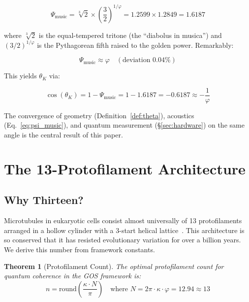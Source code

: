 \documentclass[12pt,a4paper]{article}
\theoremstyle{plain}
\newtheorem{theorem}{Theorem}[section]
\theoremstyle{definition}
\newcommand{\thetaK}{\theta_K}
\newcommand{\golden}{\varphi}
\newcommand{\kap}{\kappa}
\begin{document}
\begin{equation}
\label{eq:psi_music}
\Psi_{\mathrm{music}} = \sqrt[3]{2} \times \left(\frac{3}{2}\right)^{1/\golden} = 1.2599 \times 1.2849 = 1.6187
\end{equation}

\noindent where $\sqrt[3]{2}$ is the equal-tempered tritone (the ``diabolus in musica'') and $(3/2)^{1/\golden}$ is the Pythagorean fifth raised to the golden power. Remarkably:

\begin{equation}
\Psi_{\mathrm{music}} \approx \golden \quad (\text{deviation } 0.04\%)
\end{equation}

This yields $\thetaK$ via:

\begin{equation}
\cos(\thetaK) = 1 - \Psi_{\mathrm{music}} = 1 - 1.6187 = -0.6187 \approx -\frac{1}{\golden}
\end{equation}

The convergence of geometry (Definition~\ref{def:theta}), acoustics (Eq.~\ref{eq:psi_music}), and quantum measurement (\S\ref{sec:hardware}) on the same angle is the central result of this paper.

\section{The 13-Protofilament Architecture}
\label{sec:protofilament}

\subsection{Why Thirteen?}

Microtubules in eukaryotic cells consist almost universally of 13 protofilaments arranged in a hollow cylinder with a 3-start helical lattice~\cite{tilney1973,chrétien1991}. This architecture is so conserved that it has resisted evolutionary variation for over a billion years. We derive this number from framework constants.

\begin{theorem}[Protofilament Count]
\label{thm:thirteen}
The optimal protofilament count for quantum coherence in the GOS framework is:
\begin{equation}
n = \mathrm{round}\!\left(\frac{\kap \cdot N}{\pi}\right) \quad \text{where } N = 2\pi \cdot \kap \cdot \golden = 12.94 \approx 13
\end{equation}
\end{theorem}
\end{document}

